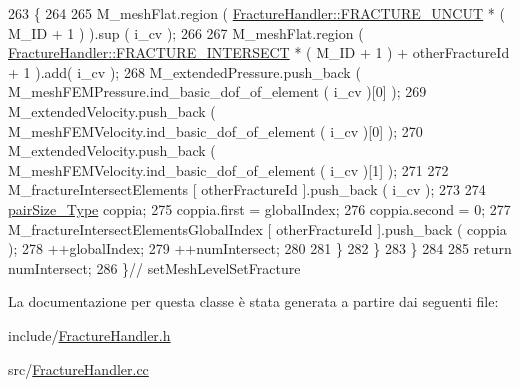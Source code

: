 \begin{DoxyCode}
263             \{  
264                 
265                 M\_meshFlat.region ( \hyperlink{classFractureHandler_a495ad4fc72d0c47c8f0424842f1153aaaa992cc3ad024a030ecd798dc319c95ac}{FractureHandler::FRACTURE\_UNCUT} * ( M\_ID
       + 1 ) ).sup ( i\_cv );
266                 
267                 M\_meshFlat.region ( \hyperlink{classFractureHandler_a495ad4fc72d0c47c8f0424842f1153aaa781cae3f3b99bf9357fed2833d315537}{FractureHandler::FRACTURE\_INTERSECT} 
      * ( M\_ID + 1 ) + otherFractureId + 1 ).add( i\_cv );
268                 M\_extendedPressure.push\_back ( M\_meshFEMPressure.ind\_basic\_dof\_of\_element ( i\_cv )[0] );
269                 M\_extendedVelocity.push\_back ( M\_meshFEMVelocity.ind\_basic\_dof\_of\_element ( i\_cv )[0] );
270                 M\_extendedVelocity.push\_back ( M\_meshFEMVelocity.ind\_basic\_dof\_of\_element ( i\_cv )[1] );
271 
272                 M\_fractureIntersectElements [ otherFractureId ].push\_back ( i\_cv );
273 
274                 \hyperlink{Core_8h_a6453867d4e9bd858ad9577b4a1078511}{pairSize\_Type} coppia;
275                 coppia.first = globalIndex;
276                 coppia.second = 0;
277                 M\_fractureIntersectElementsGlobalIndex [ otherFractureId ].push\_back ( coppia );
278                 ++globalIndex;
279                 ++numIntersect;
280            
281                 \}
282         \}
283     \}
284 
285     \textcolor{keywordflow}{return} numIntersect;
286 \}\textcolor{comment}{// setMeshLevelSetFracture}
\end{DoxyCode}


La documentazione per questa classe è stata generata a partire dai seguenti file\-:\begin{DoxyCompactItemize}
\item 
include/\hyperlink{FractureHandler_8h}{Fracture\-Handler.\-h}\item 
src/\hyperlink{FractureHandler_8cc}{Fracture\-Handler.\-cc}\end{DoxyCompactItemize}
